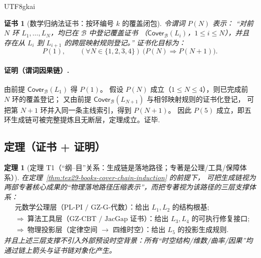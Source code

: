 \documentclass[12pt]{article}
\newtheorem{theorem}{定理}[section]
\newtheorem{Certificate}{证书}[section]
\begin{document}
\begin{CJK*}{UTF8}{gkai}
\begin{Certificate}[数学归纳法证书：按环编号 $k$ 的覆盖闭包]
\label{cert:tex29-books-cover-chain-induction}
令谓词 $P(N)$ 表示：
“对前 $N$ 环 $L_1,\dots,L_N$，均已在 $\mathcal{B}$ 中登记覆盖证书
（$\mathsf{Cover}_{\mathcal{B}}(L_i)$，$1\le i\le N$），并且存在从 $L_i$ 到 $L_{i+1}$ 的跨层映射规则登记。”
证书化目标为：
\[
  P(1),\qquad (\forall N\in\{1,2,3,4\})\ \bigl(P(N)\Rightarrow P(N+1)\bigr).
\]
\end{Certificate}

\paragraph{证明（谓词因果链）.}
由前提 $\mathsf{Cover}_{\mathcal{B}}(L_1)$ 得 $P(1)$。
假设 $P(N)$ 成立（$1\le N\le 4$），则已完成前 $N$ 环的覆盖登记；
又由前提 $\mathsf{Cover}_{\mathcal{B}}(L_{N+1})$ 与相邻映射规则的证书化登记，
可把第 $N+1$ 环并入同一条主线索引，得到 $P(N+1)$。
因此 $P(5)$ 成立，即五环生成链可被完整提炼且无断层，定理成立。证毕.

\subsection{定理（证书 + 证明）}
\label{subsec:tex29-books-cover-chain-theorem}

\begin{theorem}[定理 T1（“纲--目”关系：生成链是落地路径；专著是公理/工具/保障体系）]
\label{thm:tex29-books-cover-chain-outline-detail}
在定理~\ref{thm:tex29-books-cover-chain-induction} 的前提下，
可把生成链视为两部专著核心成果的“物理落地路径压缩表示”，而把专著视为该路径的三层支撑体系：
\[
  \begin{aligned}
    &\text{元数学公理层（PL-PI / GZ-G-代数）：给出 }L_1,L_2\text{ 的结构根基};\\
    &\Rightarrow\ \text{算法工具层（GZ-CBT / JacGap 证书）：给出 }L_3,L_4\text{ 的可执行修复接口};\\
    &\Rightarrow\ \text{物理投影层（定律空间 }\to\text{ 四维时空）：给出 }L_5\text{ 的投影生成规则}.
  \end{aligned}
\]
并且上述三层支撑不引入外部预设时空背景：所有“时空结构/维数/曲率/因果”均通过链上箭头与证书链对象化产生。
\end{theorem}


\end{CJK*}
\end{document}
